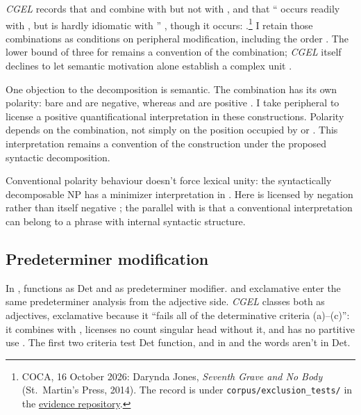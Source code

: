 \documentclass[12pt]{article}
\begin{document}
\textit{CGEL} records that  and  combine with  but not with , and that \enquote{ occurs readily with , but is hardly idiomatic with } \citep[392]{huddleston2002}, though it occurs: .\footnote{COCA, 16 October 2026: Darynda Jones, \textit{Seventh Grave and No Body} (St.~Martin's Press, 2014). The record is under \texttt{corpus/exclusion\_tests/} in the \href{https://github.com/BrettRey/determinatives-as-nouns}{evidence repository}.} I retain those combinations as conditions on peripheral modification, including the order . The lower bound of three for  \citep[392]{huddleston2002} remains a convention of the combination; \textit{CGEL} itself declines to let semantic motivation alone establish a complex unit \citep[621]{huddleston2002}.

One objection to the decomposition is semantic. The combination has its own polarity: bare  and  are negative, whereas  and  are positive \citep[393--394]{huddleston2002}. I take peripheral  to license a positive quantificational interpretation in these constructions. Polarity depends on the combination, not simply on the position occupied by  or . This interpretation remains a convention of the construction under the proposed syntactic decomposition.

Conventional polarity behaviour doesn't force lexical unity: the syntactically decomposable NP  has a minimizer interpretation in  \citep[549--550, 725]{huddleston2002}. Here  is licensed by negation rather than itself negative \citep[822--823]{huddleston2002}; the parallel with  is that a conventional interpretation can belong to a phrase with internal syntactic structure.

\subsection{Predeterminer modification}\label{sec:predeterminer-a}

In ,  functions as Det and  as predeterminer modifier.  and exclamative  enter the same predeterminer analysis from the adjective side. \textit{CGEL} classes both as adjectives, exclamative  because it \enquote{fails all of the determinative criteria (a)--(c)}: it combines with , licenses no count singular head without it, and has no partitive use \citep[539--540]{huddleston2002}. The first two criteria test Det function, and in  and  the words aren't in Det.
\end{document}
